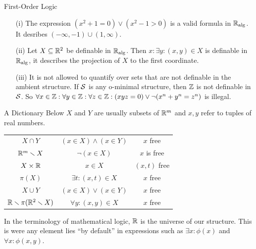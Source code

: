 \documentclass{beamer}
\begin{document}
\begin{frame}{First-Order Logic}
  \begin{example}
    \begin{enumerate}
    \item [(i)] The expression $(x^2+1=0)\vee(x^2-1>0)$ is a valid
      formula in ${\mathbb{R}}_{\mathrm{alg}}$. It desribes $(-\infty,-1)\cup(1,\infty)$.
    \item[(ii)] Let $X\subseteq{\mathbb{R}}^2$ be definable in ${\mathbb{R}}_{\mathrm{alg}}$. Then
      $x : \exists y : (x,y)\in X$ is definable in ${\mathbb{R}}_{\mathrm{alg}}$, it
      describes the projection of $X$ to the first coordinate. 
    \item[(iii)]
      It is not \alert{allowed} to quantify over sets that are not definable in
      the ambient structure. If ${\mathcal S}$ is any o-minimal
      structure, then ${\mathbb{Z}}$ is not definable in ${\mathcal S}$. So
      $\forall x \in{\mathbb{Z}}:\forall y\in{\mathbb{Z}} :\forall z\in {\mathbb{Z}} :
      (xyz=0) \vee \neg(x^n+y^n=z^n)$ is illegal.
      
    \end{enumerate}
  \end{example}
\end{frame}

\begin{frame}{A Dictionary}
  Below $X$ and $Y$ are usually subsets of ${\mathbb{R}}^m$ and $x,y$ refer to
  tuples of real numbers. 
  \begin{center}
    \begin{tabular}{c|c|c}
      $X\cap Y$  & $(x\in X)\wedge (x\in Y)$ &
                                                                                                 $x$  free\\
      ${\mathbb{R}}^m\smallsetminus X$  &  $\neg(x\in X)$ & $x$ is free \\
      $X\times{\mathbb{R}}$  & $x\in X$&
                                                                   $(x,t)$
                                                                    free\\
      $\pi(X)$  &$\exists t : (x,t)\in
                                      X$  & $x$  free
      \\  
      $X\cup Y$ & $( x\in X)\vee (x\in Y)$ &
                                                                                               $x$
                                             free\\
      ${\mathbb{R}}\smallsetminus \pi({\mathbb{R}}^2\smallsetminus X)$ & $\forall y : (x,y)\in X$ & $x$ free
                                             
    \end{tabular}
  \end{center}
  In the terminology of mathematical logic, ${\mathbb{R}}$ is the \alert{universe} of our
  structure. This is were any element lies ``by default'' in expressions
  such as $\exists x:\phi(x)$ and $\forall x:\phi(x,y)$.
\end{frame}
\end{document}
